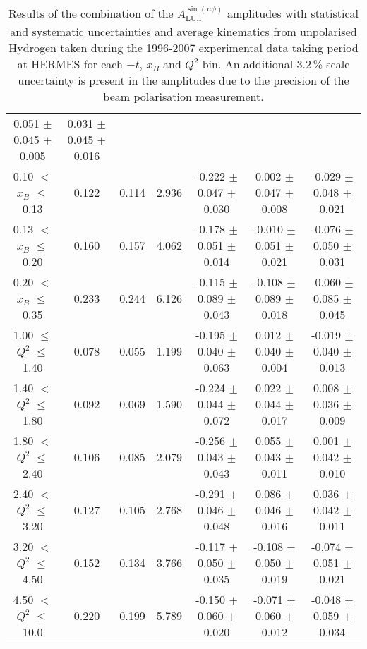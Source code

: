 {\begin{table}[width=15cm]
\begin{center}
{\begin{tabular}{|c|c|c|c|c|c|c|}
0.051 $\pm$   0.045  $\pm$   0.005 & 0.031  $\pm$  0.045  $\pm$   0.016\\
0.10 $<$ $x_{B}$ $\leqslant$ 0.13 &  0.122 &  0.114 &  2.936 &  -0.222 $\pm$   0.047  $\pm$   0.030 &
0.002  $\pm$  0.047 $\pm$    0.008 & -0.029 $\pm$ 0.048  $\pm$   0.021\\
0.13 $<$ $x_{B}$ $\leqslant$ 0.20 &  0.160 & 0.157 &  4.062 &  -0.178 $\pm$   0.051  $\pm$   0.014 &
-0.010  $\pm$  0.051 $\pm$    0.021 & -0.076 $\pm$   0.050  $\pm$   0.031\\
0.20 $<$ $x_{B}$ $\leqslant$ 0.35 &  0.233 & 0.244 &  6.126 &  -0.115  $\pm$  0.089 $\pm$    0.043 &
-0.108  $\pm$  0.089  $\pm$   0.018 & -0.060 $\pm$  0.085 $ \pm$  0.045\\
\hline
1.00 $\leqslant$ $Q^{2}$ $\leqslant$ 1.40 &  0.078 & 0.055  & 1.199  &  -0.195  $\pm$  0.040  $\pm$   0.063 &
0.012 $\pm$   0.040  $\pm$   0.004 & -0.019  $\pm$  0.040  $\pm$   0.013\\
1.40 $<$ $Q^{2}$ $\leqslant$ 1.80 &  0.092 & 0.069 &  1.590  &  -0.224  $\pm$  0.044  $\pm$   0.072 &
0.022 $\pm$  0.044  $\pm$   0.017 & 0.008 $\pm$   0.036  $\pm$   0.009\\
1.80 $<$ $Q^{2}$ $\leqslant$ 2.40 &  0.106 & 0.085 &  2.079  &  -0.256 $\pm$  0.043  $\pm$   0.043 &
0.055 $\pm$   0.043  $\pm$   0.011 & 0.001  $\pm$  0.042  $\pm$   0.010\\
2.40 $<$ $Q^{2}$ $\leqslant$ 3.20 &  0.127 & 0.105  & 2.768  &  -0.291  $\pm$  0.046   $\pm$  0.048 & 
0.086  $\pm$  0.046  $\pm$   0.016 & 0.036  $\pm$  0.042  $\pm$   0.011\\
3.20 $<$ $Q^{2}$ $\leqslant$ 4.50 &  0.152 & 0.134 &  3.766  &  -0.117  $\pm$  0.050  $\pm$   0.035 &
-0.108  $\pm$  0.050  $\pm$   0.019 & -0.074  $\pm$  0.051  $\pm$   0.021 \\
4.50 $<$ $Q^{2}$ $\leqslant$ 10.0 &  0.220 & 0.199 &  5.789  &  -0.150 $\pm$ 0.060  $\pm$   0.020 &
-0.071  $\pm$  0.060 $\pm$ 0.012 & -0.048  $\pm$  0.059  $\pm$  0.034\\
\hline
  \end{tabular}
}
 \end{center}
\caption{Results of the combination of the $A_{\textrm{LU,I}}^{\sin(n\phi)}$  amplitudes with statistical and systematic uncertainties and average kinematics from unpolarised Hydrogen taken during
the 1996-2007 experimental data taking period at HERMES for each $-t$, $x_{B}$ and $Q^{2}$ bin.
An additional 3.2\,\% scale uncertainty is present in the amplitudes due to the precision of
the beam polarisation measurement.
}
\end{table}


}
